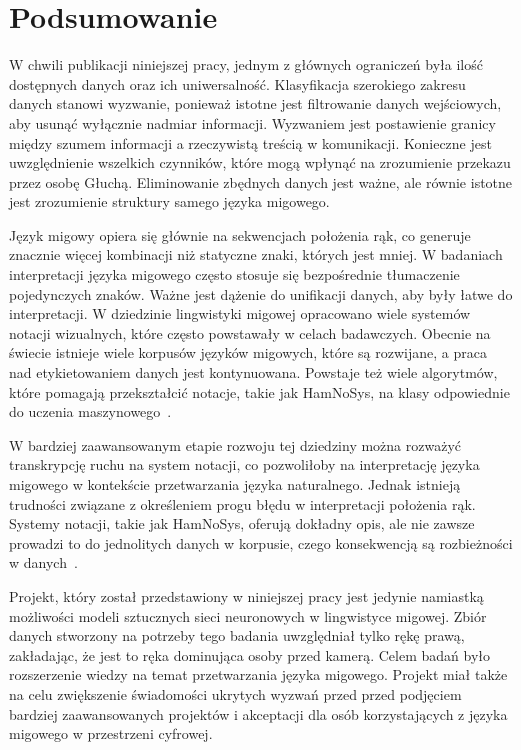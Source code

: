 \hypersetup{pageanchor=true}

\chapter{Podsumowanie}\label{ch:summary}

W chwili publikacji niniejszej pracy, jednym z głównych ograniczeń była ilość dostępnych danych oraz ich uniwersalność. Klasyfikacja szerokiego zakresu danych stanowi wyzwanie, ponieważ istotne jest filtrowanie danych wejściowych, aby usunąć wyłącznie nadmiar informacji. Wyzwaniem jest postawienie granicy między szumem informacji a rzeczywistą treścią w komunikacji. Konieczne jest uwzględnienie wszelkich czynników, które mogą wpłynąć na zrozumienie przekazu przez osobę Głuchą. Eliminowanie zbędnych danych jest ważne, ale równie istotne jest zrozumienie struktury samego języka migowego.

Język migowy opiera się głównie na sekwencjach położenia rąk, co generuje znacznie więcej kombinacji niż statyczne znaki, których jest mniej. W badaniach interpretacji języka migowego często stosuje się bezpośrednie tłumaczenie pojedynczych znaków. Ważne jest dążenie do unifikacji danych, aby były łatwe do interpretacji. W dziedzinie lingwistyki migowej opracowano wiele systemów notacji wizualnych, które często powstawały w celach badawczych. Obecnie na świecie istnieje wiele korpusów języków migowych, które są rozwijane, a praca nad etykietowaniem danych jest kontynuowana. Powstaje też wiele algorytmów, które pomagają przekształcić notacje, takie jak HamNoSys, na klasy odpowiednie do uczenia maszynowego~\cite{majchrowska2022}.

W bardziej zaawansowanym etapie rozwoju tej dziedziny można rozważyć transkrypcję ruchu na system notacji, co pozwoliłoby na interpretację języka migowego w kontekście przetwarzania języka naturalnego. Jednak istnieją trudności związane z określeniem progu błędu w interpretacji położenia rąk. Systemy notacji, takie jak HamNoSys, oferują dokładny opis, ale nie zawsze prowadzi to do jednolitych danych w korpusie, czego konsekwencją są rozbieżności w danych~\cite{ferlin2023}.

Projekt, który został przedstawiony w niniejszej pracy jest jedynie namiastką możliwości modeli sztucznych sieci neuronowych w lingwistyce migowej. Zbiór danych stworzony na potrzeby tego badania uwzględniał tylko rękę prawą, zakładając, że jest to ręka dominująca osoby przed kamerą. Celem badań było rozszerzenie wiedzy na temat przetwarzania języka migowego. Projekt miał także na celu zwiększenie świadomości ukrytych wyzwań przed przed podjęciem bardziej zaawansowanych projektów i akceptacji dla osób korzystających z języka migowego w przestrzeni cyfrowej.
